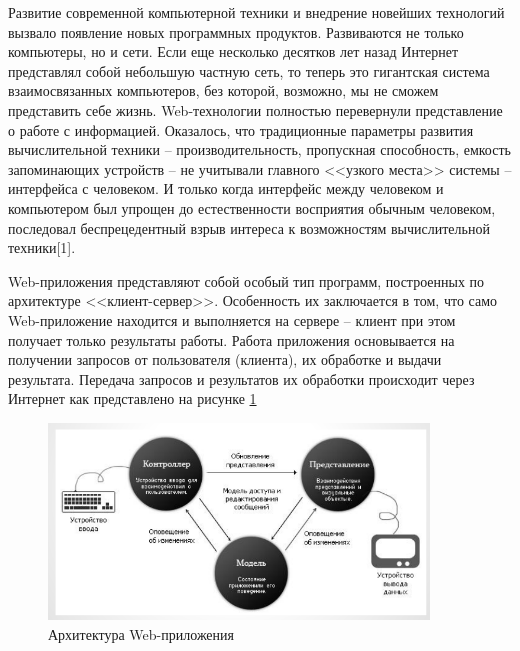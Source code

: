 
Развитие современной компьютерной техники и внедрение новейших технологий вызвало появление новых программных продуктов. 
Развиваются не только компьютеры, но и сети. Если еще несколько десятков лет назад Интернет представлял собой небольшую частную сеть, то теперь это гигантская система взаимосвязанных компьютеров, без которой, возможно, мы не сможем представить себе жизнь.
Web-технологии полностью перевернули представление о работе с информацией. Оказалось, что традиционные параметры развития вычислительной техники -- производительность, пропускная способность, емкость запоминающих устройств -- не учитывали главного <<узкого места>> системы -- интерфейса с человеком. И только когда интерфейс между человеком и компьютером был упрощен до естественности восприятия обычным человеком, последовал беспрецедентный взрыв интереса к возможностям вычислительной техники[1].

Web-приложения представляют собой особый тип программ, построенных по архитектуре <<клиент-сервер>>. Особенность их заключается в том, что само Web-приложение находится и выполняется на сервере -- клиент при этом получает только результаты работы. Работа приложения основывается на получении запросов от пользователя (клиента), их обработке и выдачи результата. Передача запросов и результатов их обработки происходит через Интернет как представлено на рисунке \ref{web}

\begin{figure}[h]
\center\includegraphics[width=0.9\textwidth]{mvc}
\caption{Архитектура Web-приложения}\label{web}
\end{figure}


